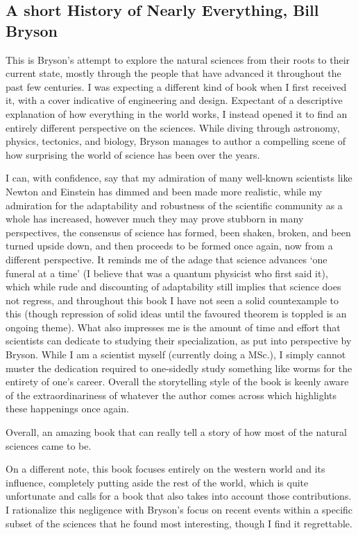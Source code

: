 \subsection{A short History of Nearly Everything, Bill Bryson}

This is Bryson's attempt to explore the natural sciences from their roots to their current state, mostly through the people that have advanced it throughout the past few centuries.
I was expecting a different kind of book when I first received it, with a cover indicative of engineering and design.
Expectant of a descriptive explanation of how everything in the world works, I instead opened it to find an entirely different perspective on the sciences.
While diving through astronomy, physics, tectonics, and biology, Bryson manages to author a compelling scene of how surprising the world of science has been over the years.

I can, with confidence, say that my admiration of many well-known scientists like Newton and Einstein has dimmed and been made more realistic, while my admiration for the adaptability and robustness of the scientific community as a whole has increased, however much they may prove stubborn in many perspectives, the consensus of science has formed, been shaken, broken, and been turned upside down, and then proceeds to be formed once again, now from a different perspective.
It reminds me of the adage that science advances `one funeral at a time' (I believe that was a quantum physicist who  first said it), which while rude and discounting of adaptability still implies that science does not regress, and throughout this book I have not seen a solid countexample to this (though repression of solid ideas until the favoured theorem is toppled is an ongoing theme).
What also impresses me is the amount of time and effort that scientists can dedicate to studying their specialization, as put into perspective by Bryson.
While I am a scientist myself (currently doing a MSc.), I simply cannot muster the dedication required to one-sidedly study something like worms for the entirety of one's career.
Overall the storytelling style of the book is keenly aware of the extraordinariness of whatever the author comes across which highlights these happenings once again.

Overall, an amazing book that can really tell a story of how most of the natural sciences came to be.

On a different note, this book focuses entirely on the western world and its influence, completely putting aside the rest of the world, which is quite unfortunate and calls for a book that also takes into account those contributions.
I rationalize this negligence with Bryson's focus on recent events within a specific subset of the sciences that he found most interesting, though I find it regrettable.
